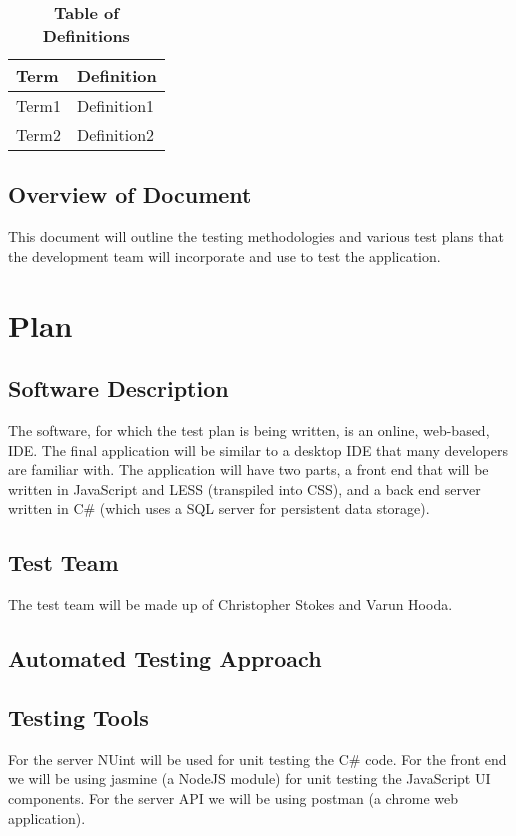 \documentclass[12pt, titlepage]{article}
\begin{document}
\begin{table}[!htbp]
\caption{\textbf{Table of Definitions}} \label{Table}

\begin{tabularx}{\textwidth}{p{3cm}X}
\toprule
\textbf{Term} & \textbf{Definition}\\
\midrule
Term1 & Definition1\\
Term2 & Definition2\\
\bottomrule
\end{tabularx}

\end{table}	

\subsection{Overview of Document}
This document will outline the testing methodologies and various test plans
that the development team will incorporate and use to test the application.

\section{Plan}
	
\subsection{Software Description}
The software, for which the test plan is being written, is an online, web-based,
IDE. The final application will be similar to a
desktop IDE that many developers are familiar with. The application will have
two parts, a front end that will be written in JavaScript and LESS (transpiled
into CSS), and a back end server written in C\# (which uses a SQL server for
persistent data storage).

\subsection{Test Team}
The test team will be made up of Christopher Stokes and Varun Hooda.

\subsection{Automated Testing Approach}

\subsection{Testing Tools}
For the server NUint will be used for unit testing the C\# code.
For the front end we will be using jasmine (a NodeJS module) for unit testing
the JavaScript UI components.
For the server API we will be using postman (a chrome web application).
\end{document}

